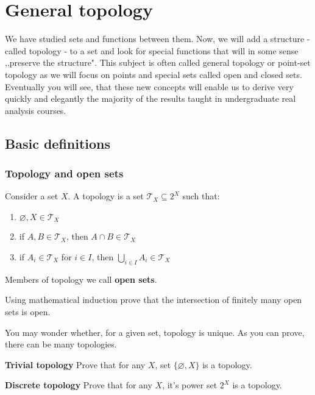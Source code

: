 \chapter{General topology}
\label{general_topology}
We have studied sets and functions between them. Now, we will add
a structure - called topology - to a set and look for special
functions that will in some sense ,,preserve the structure". This
subject is often called general topology or point-set topology as
we will focus on points and special sets called open and closed sets.
Eventually you will see, that these new concepts will enable us
to derive very quickly and elegantly the majority of the results
taught in undergraduate real analysis courses.

\section{Basic definitions}
\subsection{Topology and open sets}
Consider a set $X$. A topology is a set $\mathcal{T}_X \subseteq 2^X $ such that:
\begin{enumerate}
	\item $\varnothing, X\in \mathcal{T}_X$
	\item if $A, B\in \mathcal{T}_X$, then $A\cap B\in \mathcal{T}_X$
	\item if $A_i\in \mathcal{T}_X$ for $i\in I$, then $\bigcup_{i\in I} A_i\in \mathcal T_X$
\end{enumerate}
Members of topology we call \textbf{open sets}.

\begin{prob}
	Using mathematical induction prove that the intersection of finitely many open sets is open.
\end{prob}

You may wonder whether, for a given set, topology is unique. As you can prove, there can be many topologies.

\begin{prob}
	\textbf{Trivial topology} Prove that for any $X$, set $\{\varnothing, X\}$ is a topology.
\end{prob}

\begin{prob}
	\textbf{Discrete topology} Prove that for any $X$, it's power set $2^X$ is a topology.
\end{prob}


